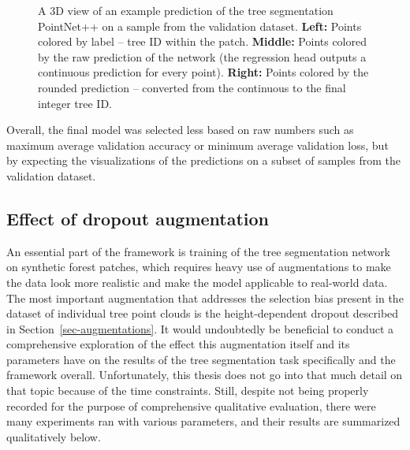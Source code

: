 \begin{figure}
\caption[A 3D view of an example prediction of the tree segmentation PointNet++.]{\label{fig-example-prediction-3d}A 3D view of an example
prediction of the tree segmentation PointNet++ on a sample from the
validation dataset. \textbf{Left:} Points colored by label -- tree ID
within the patch. \textbf{Middle:} Points colored by the raw prediction
of the network (the regression head outputs a continuous prediction for
every point). \textbf{Right:} Points colored by the rounded prediction
-- converted from the continuous to the final integer tree ID.}
\end{figure}

Overall, the final model was selected less based on raw numbers such as maximum average validation accuracy or minimum average validation loss, but by expecting the visualizations of the predictions on a subset of samples from the validation dataset.

\subsection{Effect of dropout augmentation}

An essential part of the framework is training of the tree segmentation network on synthetic forest patches, which requires heavy use of augmentations to make the data look more realistic and make the model applicable to real-world data.
The most important augmentation that addresses the selection bias present in the dataset of individual tree point clouds is the height-dependent dropout described in Section~\ref{sec-augmentations}.
It would undoubtedly be beneficial to conduct a comprehensive exploration of the effect this augmentation itself and its parameters have on the results of the tree segmentation task specifically and the framework overall.
Unfortunately, this thesis does not go into that much detail on that topic because of the time constraints.
Still, despite not being properly recorded for the purpose of comprehensive qualitative evaluation, there were many experiments ran with various parameters, and their results are summarized qualitatively below.

